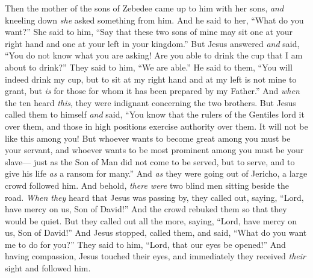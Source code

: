 \begin{biblechapter}
 Then the mother of the sons of Zebedee came up to him with her sons, \textit{and} kneeling down \textit{she} asked something from him.
\verse And he said to her, “What do you want?” She said to him, “Say that these two sons of mine may sit one at your right hand and one at your left in your kingdom.”
\verse But Jesus answered \textit{and} said, “You do not know what you are asking! Are you able to drink the cup that I am about to drink?” They said to him, “We are able.”
\verse He said to them, “You will indeed drink my cup, but to sit at my right hand and at my left is not mine to grant, but \textit{is} for those for whom it has been prepared by my Father.”
\verse And \textit{when} the ten heard \textit{this}, they were indignant concerning the two brothers.
\verse But Jesus called them to himself \textit{and} said, “You know that the rulers of the Gentiles lord it over them, and those in high positions exercise authority over them.
\verse It will not be like this among you! But whoever wants to become great among you must be your servant,
\verse and whoever wants to be most prominent among you must be your slave—
\verse just as the Son of Man did not come to be served, but to serve, and to give his life \textit{as} a ransom for many.”
 And \textit{as} they were going out of Jericho, a large crowd followed him.
\verse And behold, \textit{there were} two blind men sitting beside the road. \textit{When they} heard that Jesus was passing by, they called out, saying, “Lord, have mercy on us, Son of David!”
\verse And the crowd rebuked them so that they would be quiet. But they called out all the more, saying, “Lord, have mercy on us, Son of David!”
\verse And Jesus stopped, called them, and said, “What do you want me to do for you?”
\verse They said to him, “Lord, that our eyes be opened!”
\verse And having compassion, Jesus touched their eyes, and immediately they received \textit{their} sight and followed him.
\end{biblechapter}

